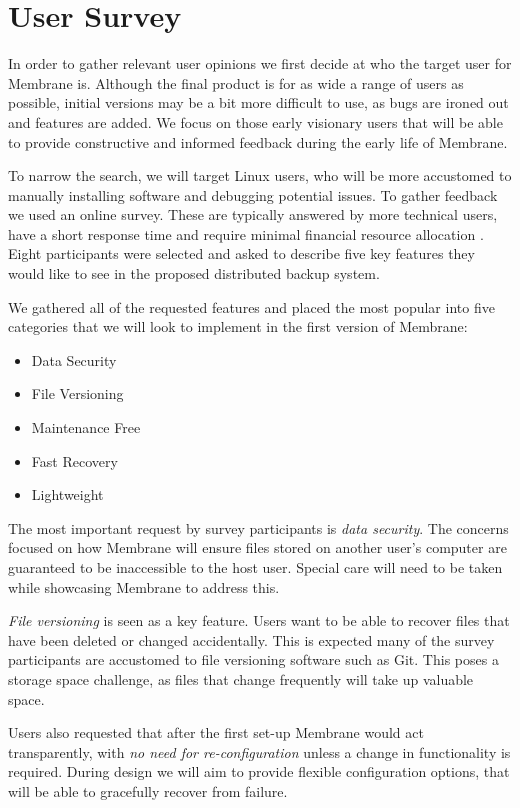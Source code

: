 \documentclass[11pt, a4paper, twocolumn, twoside]{report}
\begin{document}
\section{User Survey}

In order to gather relevant user opinions we first decide at who the target user for Membrane is. Although the final product is for as wide a range of users as possible, initial versions may be a bit more difficult to use, as bugs are ironed out and features are added. We focus on those early visionary users that will be able to provide constructive and informed feedback during the early life of Membrane.

To narrow the search, we will target Linux users, who will be more accustomed to manually installing software and debugging potential issues. To gather feedback we used an online survey. These are typically answered by more technical users, have a short response time and require minimal financial resource allocation \citep{ilieva2002online}. Eight participants were selected and asked to describe five key features they would like to see in the proposed distributed backup system.

We gathered all of the requested features and placed the most popular into five categories that we will look to implement in the first version of Membrane:

\begin{itemize}
 \item Data Security
 \item File Versioning
 \item Maintenance Free
 \item Fast Recovery
 \item Lightweight
\end{itemize}

The most important request by survey participants is \emph{data security}. The concerns focused on how Membrane will ensure files stored on another user's computer are guaranteed to be inaccessible to the host user. Special care will need to be taken while showcasing Membrane to address this.

\emph{File versioning} is seen as a key feature. Users want to be able to recover files that have been deleted or changed accidentally. This is expected many of the survey participants are accustomed to file versioning software such as Git. This poses a storage space challenge, as files that change frequently will take up valuable space.

Users also requested that after the first set-up Membrane would act transparently, with \emph{no need for re-configuration} unless a change in functionality is required. During design we will aim to provide flexible configuration options, that will be able to gracefully recover from failure.
\end{document}
